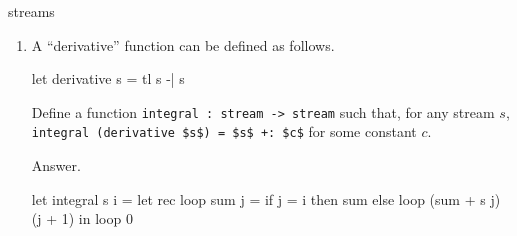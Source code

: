 \begin{exercise}{streams}
\begin{enumerate}
\begin{itemize}
\item \lstinline!map : (int -> int) -> stream -> stream!.

Apply a function to each element of the stream.

\lstinline!map $f$ $(x_0, x_1, x_2, \ldots)$ = $(f\ x_0, f\ x_1, f\ x_2, \ldots)$!.

\begin{answer}\ifanswers
Answer.
\begin{ocaml}
let map f s = (fun i -> f (s i))
\end{ocaml}
\fi\end{answer}

\end{itemize}

\item A ``derivative'' function can be defined as follows.
\begin{ocaml}
let derivative s = tl s -| s
\end{ocaml}
%
Define a function \hbox{\lstinline/integral : stream -> stream/} such that, for any stream $s$,
\hbox{\lstinline/integral (derivative $s$) = $s$ +: $c$/} for some constant $c$.

\begin{answer}\ifanswers
Answer.
\begin{ocaml}
let integral s i =
   let rec loop sum j =
      if j = i then
         sum
      else
         loop (sum + s j) (j + 1)
   in
      loop 0
\end{ocaml}
\fi\end{answer}
\end{enumerate}
\end{exercise}

